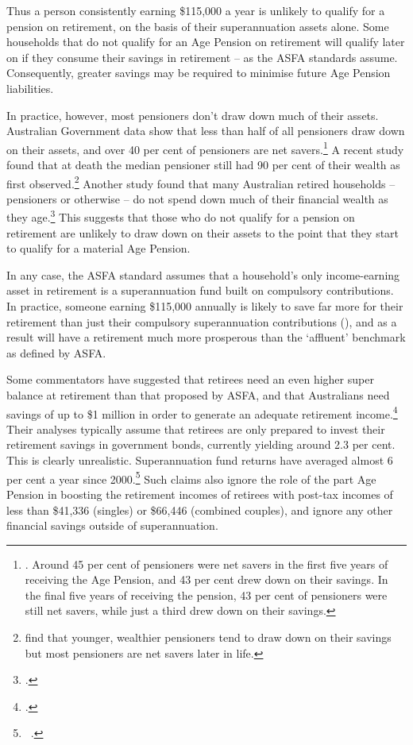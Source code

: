 \documentclass{grattanAlpha}
\begin{document}
Thus a person consistently earning \$115,000 a year is unlikely to qualify for a pension on retirement, on the basis of their superannuation assets alone. Some households that do not qualify for an Age Pension on retirement will qualify later on if they consume their savings in retirement – as the ASFA standards assume. Consequently, greater savings may be required to minimise future Age Pension liabilities.

In practice, however, most pensioners don’t draw down much of their assets. Australian Government data show that less than half of all pensioners draw down on their assets, and over 40 per cent of pensioners are net savers.\footnote{\textcite{Morrison2015TheBestFormOfWelfare}. Around 45 per cent of pensioners were net savers in the first five years of receiving the Age Pension, and 43 per cent drew down on their savings. In the final five years of receiving the pension, 43 per cent of pensioners were still net savers, while just a third drew down on their savings.}  
A recent study found that at death the median pensioner still had 90 per cent of their wealth as first observed.\footnote{\textcite{WuAsherMeyrickeEtAl2015} find that younger, wealthier pensioners tend to draw down on their savings but most pensioners are net savers later in life.} Another study found that many Australian retired households – pensioners or otherwise – do not spend down much of their financial wealth as they age.\footcite{SpicerStavrunovaThorp2015} This suggests that those who do not qualify for a pension on retirement are unlikely to draw down on their assets to the point that they start to qualify for a material Age Pension. 

In any case, the ASFA standard assumes that a household’s only income-earning asset in retirement is a superannuation fund built on compulsory contributions. In practice, someone earning \$115,000 annually is likely to save far more for their retirement than just their compulsory superannuation contributions (), and as a result will have a retirement much more prosperous than the ‘affluent’ benchmark as defined by ASFA. 

Some commentators have suggested that retirees need an even higher super balance at retirement than that proposed by ASFA, and that Australians need savings of up to \$1 million in order to generate an adequate retirement income.\footcite{Cooper2015}  Their analyses typically assume that retirees are only prepared to invest their retirement savings in government bonds, currently yielding around 2.3 per cent. This is clearly unrealistic. Superannuation fund returns have averaged almost 6 per cent a year since 2000.\footnote{\gao\ \textcite{APRA2015JuneSuperPerformance}.} 
Such claims also ignore the role of the part Age Pension in boosting the retirement incomes of retirees with post-tax incomes of less than \$41,336 (singles) or \$66,446 (combined couples), and ignore any other financial savings outside of superannuation. 
\end{document}
